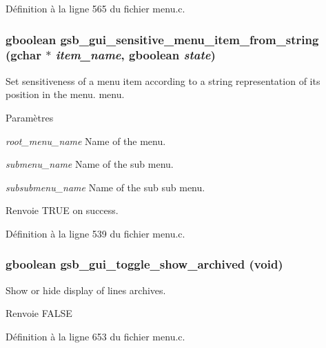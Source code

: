 Définition à la ligne 565 du fichier menu.c.

\subsubsection[{gsb\_\-gui\_\-sensitive\_\-menu\_\-item\_\-from\_\-string}]{\setlength{\rightskip}{0pt plus 5cm}gboolean gsb\_\-gui\_\-sensitive\_\-menu\_\-item\_\-from\_\-string (gchar $\ast$ {\em item\_\-name}, \/  gboolean {\em state})}\label{menu_8c_aa52fc499e8216c49fa496f24c46eb811}
Set sensitiveness of a menu item according to a string representation of its position in the menu. menu.


\begin{DoxyParams}{Paramètres}
\item[{\em root\_\-menu\_\-name}]Name of the menu. \item[{\em submenu\_\-name}]Name of the sub menu. \item[{\em subsubmenu\_\-name}]Name of the sub sub menu.\end{DoxyParams}
\begin{DoxyReturn}{Renvoie}
TRUE on success. 
\end{DoxyReturn}


Définition à la ligne 539 du fichier menu.c.

\subsubsection[{gsb\_\-gui\_\-toggle\_\-show\_\-archived}]{\setlength{\rightskip}{0pt plus 5cm}gboolean gsb\_\-gui\_\-toggle\_\-show\_\-archived (void)}\label{menu_8c_aa2af14ac64481c25621aef9c3e43eea5}
Show or hide display of lines archives.

\begin{DoxyReturn}{Renvoie}
FALSE 
\end{DoxyReturn}


Définition à la ligne 653 du fichier menu.c.

